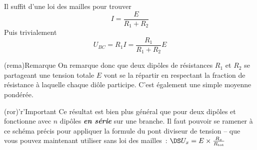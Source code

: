 \documentclass[../../main/main.tex]{subfiles}
\begin{document}
{\begin{tcbraster}[raster columns=3, raster equal height=rows]
\begin{tcb}
        Il suffit d'une loi des mailles pour trouver
        \[I = \frac{E}{R_1+R_2}\]
        Puis trivialement
        \[U_{BC} = R_1I = \frac{R_1}{R_1+R_2}E\]
    \end{tcb}
\end{tcbraster}
\begin{tcbraster}[raster columns=2, raster equal height=rows]
    \begin{tcb}(rema){Remarque}
        On remarque donc que deux dipôles de résistances $R_1$ et $R_2$ se
        partageant une tension totale $E$ vont se la répartir
        en respectant la fraction de résistance à laquelle chaque diôle
        participe. C'est également une simple moyenne pondérée.
    \end{tcb}
    \begin{tcb}(ror)'r'{Important}
        Ce résultat est bien plus général que pour deux dipôles et fonctionne
        avec $n$ dipôles \textbf{\textit{en série}} sur une branche. Il faut
        pouvoir se ramener à ce schéma précis pour appliquer la formule du pont
        diviseur de tension – que vous pouvez maintenant utiliser sans loi des
        mailles~: $\DS U_x = E\times \frac{R_x}{R_\mathrm{tot}}$
    \end{tcb}
\end{tcbraster}

}
\end{document}
